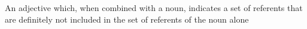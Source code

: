An adjective which, when combined with a noun, indicates a set of referents that are definitely not included in the set of referents of the noun alone
